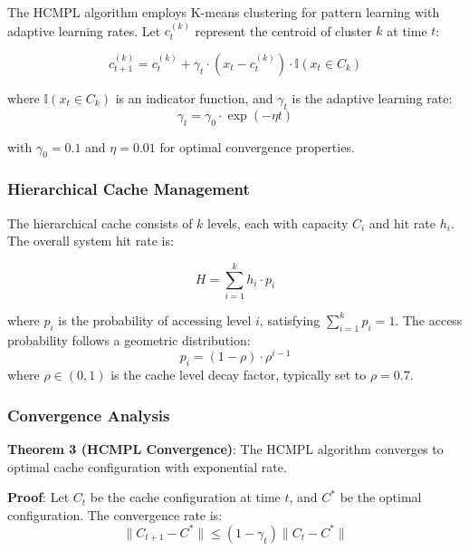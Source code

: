 \documentclass[conference]{IEEEtran}
\begin{document}
The HCMPL algorithm employs K-means clustering for pattern learning with adaptive learning rates. Let $c_t^{(k)}$ represent the centroid of cluster $k$ at time $t$:

\begin{equation}
c_{t+1}^{(k)} = c_t^{(k)} + \gamma_t \cdot (x_t - c_t^{(k)}) \cdot \mathbb{I}(x_t \in C_k)
\end{equation}

where $\mathbb{I}(x_t \in C_k)$ is an indicator function, and $\gamma_t$ is the adaptive learning rate:
\begin{equation}
\gamma_t = \gamma_0 \cdot \exp(-\eta t)
\end{equation}

with $\gamma_0 = 0.1$ and $\eta = 0.01$ for optimal convergence properties.

\subsubsection{Hierarchical Cache Management}

The hierarchical cache consists of $k$ levels, each with capacity $C_i$ and hit rate $h_i$. The overall system hit rate is:

\begin{equation}
H = \sum_{i=1}^{k} h_i \cdot p_i
\end{equation}

where $p_i$ is the probability of accessing level $i$, satisfying $\sum_{i=1}^{k} p_i = 1$. The access probability follows a geometric distribution:
\begin{equation}
p_i = (1-\rho) \cdot \rho^{i-1}
\end{equation}
where $\rho \in (0,1)$ is the cache level decay factor, typically set to $\rho = 0.7$.

\subsubsection{Convergence Analysis}

\textbf{Theorem 3 (HCMPL Convergence)}: The HCMPL algorithm converges to optimal cache configuration with exponential rate.

\textbf{Proof}: Let $C_t$ be the cache configuration at time $t$, and $C^*$ be the optimal configuration. The convergence rate is:
\begin{equation}
\|C_{t+1} - C^*\| \leq (1-\gamma_t)\|C_t - C^*\|
\end{equation}
\end{document}
